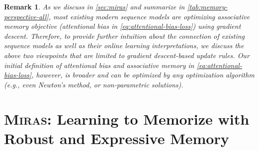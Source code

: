 \documentclass{article}
\newcommand{\framework}[0]{\textsc{Miras}}
\newtheorem{remark}{Remark}
\theoremstyle{plain}
\theoremstyle{definition}
\theoremstyle{remark}
\begin{document}
\begin{remark}
As we discuss in \autoref{sec:miras} and summarize in \autoref{tab:memory-perspective-all}, most existing modern sequence models are optimizing associative memory objective (attentional bias in \autoref{eq:attentional-bias-loss}) using gradient descent. Therefore, to provide further intuition about the connection of existing sequence models as well as their online learning interpretations, we discuss the above two viewpoints that are limited to gradient descent-based update rules. Our initial definition of attentional bias and associative memory in \autoref{eq:attentional-bias-loss}, however, is broader and can be optimized by any optimization algorithm (e.g., even Newton's method, or non-parametric solutions).  
\end{remark}







\section{\framework: Learning to Memorize with Robust and Expressive Memory}\label{sec:miras}
\end{document}
